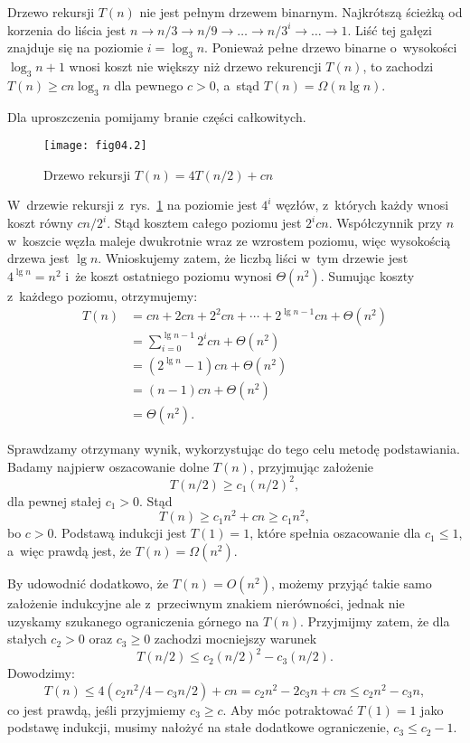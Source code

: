 \exercise %
Drzewo rekursji $T(n)$ nie jest pełnym drzewem binarnym. Najkrótszą ścieżką od korzenia do liścia jest $n\to n/3\to n/9\to\dots\to n/3^i\to\dots\to1$. Liść tej gałęzi znajduje się na poziomie $i=\log_3n$. Ponieważ pełne drzewo binarne o~wysokości $\log_3n+1$ wnosi koszt nie większy niż drzewo rekurencji $T(n)$, to zachodzi $T(n)\ge cn\log_3n$ dla pewnego $c>0$, a~stąd $T(n)=\Omega(n\lg n)$.

\exercise %
Dla uproszczenia pomijamy branie części całkowitych.
\begin{figure}[ht]
	\begin{center}
		\texttt{[image: fig04.2]}
	\end{center}
	\caption{Drzewo rekursji $T(n)=4T(n/2)+cn$} \label{fig:4.2-3}
\end{figure}
W~drzewie rekursji z~rys.~\ref{fig:4.2-3} na  poziomie jest $4^i$ węzłów, z~których każdy wnosi koszt równy $cn/2^i$. Stąd kosztem całego poziomu jest $2^icn$. Współczynnik przy $n$ w~koszcie węzła maleje dwukrotnie wraz ze wzrostem poziomu, więc wysokością drzewa jest $\lg n$. Wnioskujemy zatem, że liczbą liści w~tym drzewie jest $4^{\lg n}=n^2$ i~że koszt ostatniego poziomu wynosi $\Theta(n^2)$. Sumując koszty z~każdego poziomu, otrzymujemy:
\begin{align*}
	T(n) &= cn+2cn+2^2cn+\cdots+2^{\lg n-1}cn+\Theta(n^2) \\
	&= \sum_{i=0}^{\lg n-1}2^icn+\Theta(n^2) \\
	&= (2^{\lg n}-1)cn+\Theta(n^2) \\
	&= (n-1)cn+\Theta(n^2) \\
	&= \Theta(n^2).
\end{align*}

Sprawdzamy otrzymany wynik, wykorzystując do tego celu metodę podstawiania. Badamy najpierw oszacowanie dolne $T(n)$, przyjmując założenie
\[
	T(n/2) \ge c_1(n/2)^2,
\]
dla pewnej stałej $c_1>0$. Stąd
\[
	T(n) \ge c_1n^2+cn \ge c_1n^2,
\]
bo $c>0$. Podstawą indukcji jest $T(1)=1$, które spełnia oszacowanie dla $c_1\le1$, a~więc prawdą jest, że $T(n)=\Omega(n^2)$.

By udowodnić dodatkowo, że $T(n)=O(n^2)$, możemy przyjąć takie samo założenie indukcyjne ale z~przeciwnym znakiem nierówności, jednak nie uzyskamy szukanego ograniczenia górnego na $T(n)$. Przyjmijmy zatem, że dla stałych $c_2>0$ oraz $c_3\ge0$ zachodzi mocniejszy warunek
\[
	T(n/2) \le c_2(n/2)^2-c_3(n/2).
\]
Dowodzimy:
\[
	T(n) \le 4(c_2n^2\!/4-c_3n/2)+cn = c_2n^2-2c_3n+cn \le c_2n^2-c_3n,
\]
co jest prawdą, jeśli przyjmiemy $c_3\ge c$. Aby móc potraktować $T(1)=1$ jako podstawę indukcji, musimy nałożyć na stałe dodatkowe ograniczenie, $c_3\le c_2-1$.

